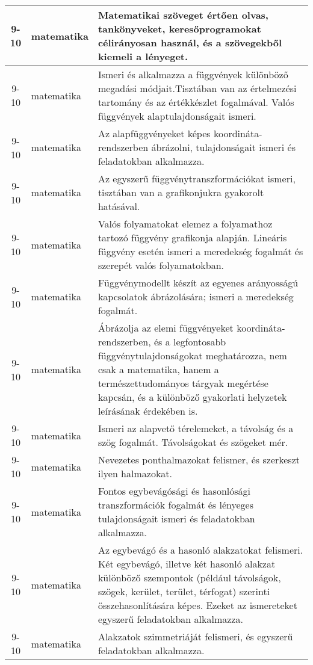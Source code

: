 \begin{small}
\begin{longtable}{c | p{2cm} |  p{11cm} }
              9-10 & matematika & Matematikai szöveget értően olvas, tankönyveket, keresőprogramokat célirányosan használ, és a szövegekből kiemeli a lényeget. \\ \hline
              9-10 & matematika & Ismeri és alkalmazza a függvények különböző megadási módjait.Tisztában van az értelmezési tartomány és az értékkészlet fogalmával. Valós függvények alaptulajdonságait ismeri. \\ \hline
              9-10 & matematika & Az alapfüggvényeket képes koordináta-rendszerben ábrázolni, tulajdonságait ismeri és feladatokban alkalmazza. \\ \hline
              9-10 & matematika & Az egyszerű függvénytranszformációkat ismeri, tisztában van a grafikonjukra gyakorolt hatásával. \\ \hline
              9-10 & matematika & Valós folyamatokat elemez a folyamathoz tartozó függvény grafikonja alapján. Lineáris függvény esetén ismeri a meredekség fogalmát és szerepét valós folyamatokban. \\ \hline
              9-10 & matematika & Függvénymodellt készít az egyenes arányosságú kapcsolatok ábrázolására; ismeri a meredekség fogalmát. \\ \hline
              9-10 & matematika & Ábrázolja az elemi függvényeket koordináta-rendszerben, és a legfontosabb függvénytulajdonságokat meghatározza, nem csak a matematika, hanem a természettudományos tárgyak megértése kapcsán, és a különböző gyakorlati helyzetek leírásának érdekében is. \\ \hline
              9-10 & matematika & Ismeri az alapvető térelemeket, a távolság és a szög fogalmát. Távolságokat és szögeket mér. \\ \hline
              9-10 & matematika & Nevezetes ponthalmazokat felismer, és szerkeszt ilyen halmazokat. \\ \hline
              9-10 & matematika & Fontos egybevágósági és hasonlósági transzformációk fogalmát  és lényeges tulajdonságait ismeri és feladatokban alkalmazza. \\ \hline
              9-10 & matematika & Az egybevágó és a hasonló alakzatokat felismeri. Két egybevágó, illetve két hasonló alakzat különböző szempontok (például távolságok, szögek, kerület, terület, térfogat) szerinti összehasonlítására képes. Ezeket az ismereteket egyszerű feladatokban alkalmazza. \\ \hline
              9-10 & matematika & Alakzatok szimmetriáját felismeri, és egyszerű feladatokban alkalmazza. \\ \hline

\end{longtable}
\end{small}
